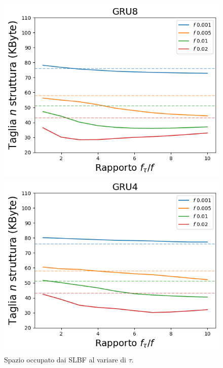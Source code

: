 \documentclass{beamer}
\begin{document}
\begin{frame}
\begin{figure}[htbp]
\begin{minipage}{0.25\textwidth}
        \end{minipage}%
        \hfill
        \begin{minipage}{0.25\textwidth}
        \centering
        \includegraphics[width=\textwidth]{immagini/7/SLBF/GRU8_Taglia.png}
        \end{minipage}%
        \hfill
        \begin{minipage}{0.25\textwidth}
        \centering
        \includegraphics[width=\textwidth]{immagini/7/SLBF/GRU4_Taglia.png}
        \end{minipage}%
        \hfill

        \begin{minipage}[t]{\textwidth}
        \centering
        \caption{Spazio occupato dai SLBF al variare di $\tau$.}
        \end{minipage}%
    \end{figure}
\end{frame}
\end{document}
